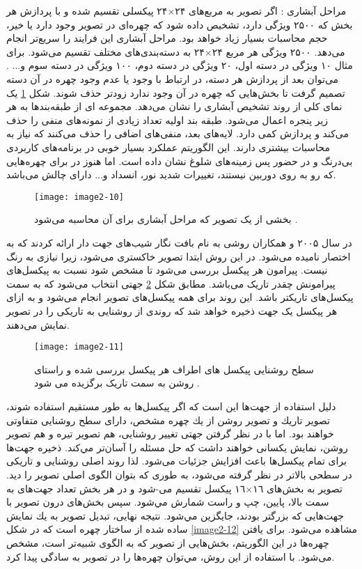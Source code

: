 \noindent
مراحل آبشاری : اگر تصویر به مربع‌های ۲۴×۲۴ پیکسلی تقسیم شده و با پردازش هر بخش که ۲۵۰۰ ویژگی دارد، تشخیص داده شود که چهره‌ای در تصویر وجود دارد یا خیر، حجم محاسبات بسیار زیاد خواهد بود. مراحل آبشاری این فرایند را سریع‌تر انجام می‌دهد. ۲۵۰۰ ویژگی هر مربع ۲۴×۲۴ به دسته‌بندی‌های مختلف تقسیم می‌شود. برای مثال ۱۰ ویژگی در دسته‌ اول، ۲۰ ویژگی در دسته دوم، ۱۰۰ ویژگی در دسته سوم و... . می‌توان بعد از پردازش هر دسته، در ارتباط با وجود یا عدم وجود چهره در آن دسته تصمیم گرفت تا بخش‌هایی که چهره در آن وجود ندارد زودتر حذف شوند. شکل \ref{image2-10} یک نمای کلی از روند تشخیص آبشاری را نشان می‌دهد. مجموعه ای از طبقه‌بندها به هر زیر پنجره اعمال می‌شود. طبقه بند اولیه تعداد زیادی از نمونه‌های منفی را حذف می‌کند و پردازش کمی دارد. لایه‌های بعد، منفی‌های اضافی را حذف می‌کنند که نیاز به محاسبات بیشتری دارند. این الگوریتم عملکرد بسیار خوبی در برنامه‌های کاربردی بی‌درنگ و در حضور پس زمینه‌های شلوغ نشان داده است. اما هنوز در برای چهره‌هایی که رو به روی دوربین نیستند، تغییرات شدید نور، انسداد و... دارای چالش می‌باشد.

\begin{figure}[h]
\centering
  \texttt{[image: image2-10]}
  \caption{بخشی از یک تصویر که مراحل آبشاری برای آن محاسبه می‌شود \cite{990517}.}
  \label{image2-10}
\end{figure}

\noindent
در سال ۲۰۰۵  و همکاران \cite{1467360} روشی به نام بافت نگار شیب‌های جهت دار  ارائه کردند که به اختصار  نامیده می‌شود. در این روش ابتدا تصویر خاکستری می‌شود، زیرا نیازی به رنگ نیست. پیرامون هر پیکسل بررسی می‌شود تا مشخص شود نسبت به پیکسل‌های پیرامونش چقدر تاریک می‌باشد. مطابق شکل \ref{image2-11} جهتی انتخاب می‌شود که به سمت پیکسل‌های تاریکتر باشد. این روند برای همه پیکسل‌های تصوير انجام می‌شود و به ازای هر پیکسل یک جهت ذخیره خواهد شد که روندی از روشنايى به تاريكى را در تصوير نمايش می‌دهند.

\begin{figure}
	\centering
	\texttt{[image: image2-11]}
	\caption{سطح روشنایی پیکسل های اطراف هر پیکسل بررسی شده و راستای روشن به سمت تاریک برگزیده می شود \cite{1467360}.}
	\label{image2-11}
\end{figure}

\noindent
دليل استفاده از جهت‌ها این است که اگر پیکسل‌ها به طور مستقيم استفاده شوند، تصوير تاريك و تصوير روشن از يك چهره مشخص، دارای سطح روشنایی متفاوتى خواهند بود. اما با در نظر گرفتن جهتى تغییر روشنايى، هم تصوير تيره و هم تصوير روشن، نمايش يكسانى خواهند داشت كه حل مسئله را آسان‌تر مي‌كند. ذخيره جهت‌ها براى تمام پیکسل‌ها باعث افزایش جزئيات می‌شود. لذا روند اصلى روشنايى و تاريكى در سطحی بالاتر در نظر گرفته می‌شود، به طورى كه بتوان الگوى اصلى تصوير را ديد. تصوير به بخش‌هاى ١٦×١٦ پيكسل تقسیم می-شود و در هر بخش تعداد جهت‌هاى به سمت بالا، پايين، چپ و راست شمارش مي‌شود. سپس بخش‌هاى درون تصوير با جهت‌هايى كه بزرگتر بودند، جايگزين مي‌شود. نتيجه نهايى، تبديل تصوير به يك نمايش ساده شده از ساختار چهره است که در شکل \ref{image2-12} مشاهده می‌شود. براى يافتن چهره‌ها در این الگوریتم، بخش‌هايى از تصوير كه به الگوى  شبيه‌تر است، مشخص می‌شود. با استفاده از اين روش، مي‌توان چهره‌ها را در تصویر به سادگى پيدا كرد.

